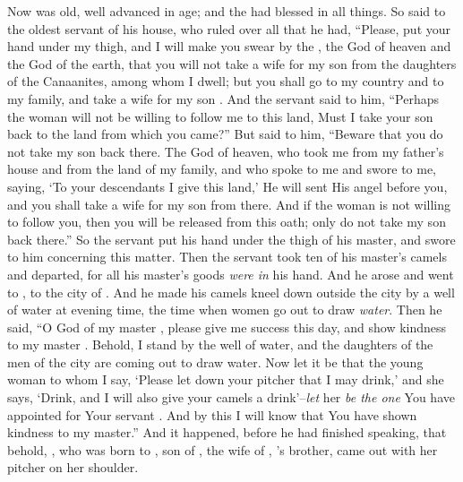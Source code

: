 
\bverse Now \Abraham was old, well advanced in age; and the \lord had blessed \Abraham in all things.
\bverse So \Abraham said to the oldest servant of his house, who ruled over all that he had, ``Please, put your hand under my thigh,
\bverse and I will make you swear by the \lord, the God of heaven and the God of the earth, that you will not take a wife for my son from the daughters of the Canaanites, among whom I dwell;
\bverse but you shall go to my country and to my family, and take a wife for my son .
\bverse And the servant said to him, ``Perhaps the woman will not be willing to follow me to this land, Must I take your son back to the land from which you came?''
\bverse But \Abraham said to him, ``Beware that you do not take my son back there.
\bverse The \lord God of heaven, who took me from my father's house and from the land of my family, and who spoke to me and swore to me, saying, `To your descendants I give this land,' He will sent His angel before you, and you shall take a wife for my son from there.
\bverse And if the woman is not willing to follow you, then you will be released from this oath; only do not take my son back there.''
\bverse So the servant put his hand under the thigh of \Abraham his master, and swore to him concerning this matter.
\bverse Then the servant took ten of his master's camels and departed, for all his master's goods \textit{were in} his hand. And he arose and went to , to the city of .
\bverse And he made his camels kneel down outside the city by a well of water at evening time, the time when women go out to draw \textit{water}.
\bverse Then he said, ``O \lord God of my master \Abraham, please give me success this day, and show kindness to my master \Abraham.
\bverse Behold, \here I stand by the well of water, and the daughters of the men of the city are coming out to draw water.
\bverse Now let it be that the young woman to whom I say, `Please let down your pitcher that I may drink,' and she says, `Drink, and I will also give your camels a drink'--\textit{let} her \textit{be the one} You have appointed for Your servant \Isaac. And by this I will know that You have shown kindness to my master.''
\bverse And it happened, before he had finished speaking, that behold, , who was born to , son of , the wife of , \Abraham's brother, came out with her pitcher on her shoulder.
